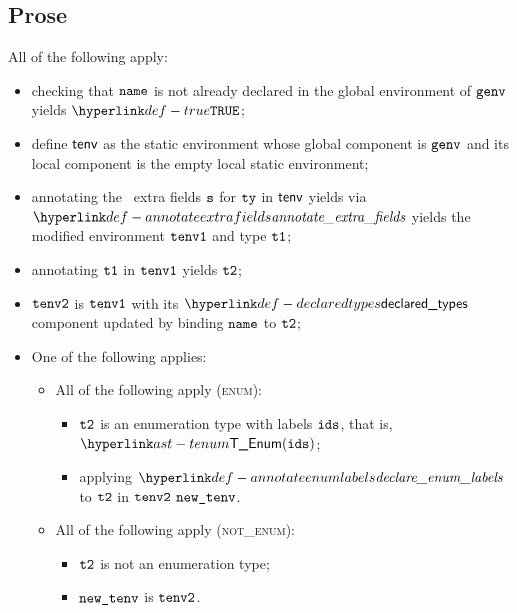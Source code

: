 \subsection{Prose}
All of the following apply:
\begin{itemize}
  \item checking that $\texttt{name}$ is not already declared in the global environment of $\texttt{genv}$ yields $\True$\ProseOrTypeError;
  \item define $\textsf{tenv}$ as the static environment whose global component is $\texttt{genv}$ and its local component is the empty local
        static environment;
  \item annotating the \optional\ extra fields $\texttt{s}$ for $\texttt{ty}$ in $\textsf{tenv}$ yields via \\ $\annotateextrafields$
        yields the modified environment $\texttt{tenv1}$ and type $\texttt{t1}$\ProseOrTypeError;
  \item annotating $\texttt{t1}$ in $\texttt{tenv1}$ yields $\texttt{t2}$\ProseOrTypeError;
  \item $\texttt{tenv2}$ is $\texttt{tenv1}$ with its $\declaredtypes$ component updated by binding $\texttt{name}$ to $\texttt{t2}$;
  \item One of the following applies:
  \begin{itemize}
    \item All of the following apply (\textsc{enum}):
    \begin{itemize}
      \item $\texttt{t2}$ is an enumeration type with labels $\texttt{ids}$, that is, $\TEnum(\ids)$;
      \item applying $\declareenumlabels$ to $\texttt{t2}$ in $\texttt{tenv2}$ $\texttt{new\_tenv}$\ProseOrTypeError.
    \end{itemize}

    \item All of the following apply (\textsc{not\_enum}):
    \begin{itemize}
      \item $\texttt{t2}$ is not an enumeration type;
      \item $\texttt{new\_tenv}$ is $\texttt{tenv2}$.
    \end{itemize}
  \end{itemize}
\end{itemize}

